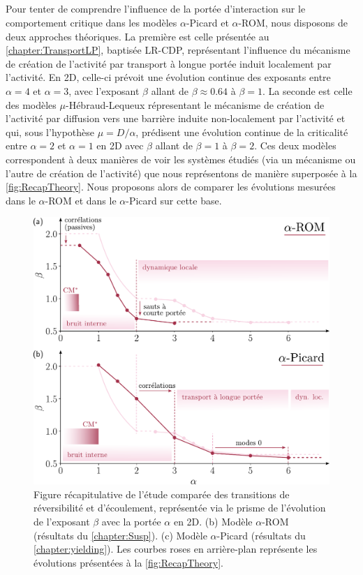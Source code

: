 \subparagraph{}Pour tenter de comprendre l'influence de la portée d'interaction sur le comportement critique dans les modèles $\alpha$-Picard et $\alpha$-ROM, nous disposons de deux approches théoriques. La première est celle présentée au \autoref{chapter:TransportLP}, baptisée LR-CDP, représentant l'influence du mécanisme de création de l'activité par transport à longue portée induit localement par l'activité. En 2D, celle-ci prévoit une évolution continue des exposants entre $\alpha = 4$ et $\alpha = 3$, avec l'exposant $\beta$ allant de $\beta \approx 0.64$ à $\beta = 1$. La seconde est celle des modèles $\mu$-Hébraud-Lequeux répresentant le mécanisme de création de l'activité par diffusion vers une barrière induite non-localement par l'activité et qui, sous l'hypothèse $\mu = D/\alpha$, prédisent une évolution continue de la criticalité entre $\alpha=2$ et $\alpha = 1$ en 2D avec $\beta$ allant de $\beta = 1$ à $\beta = 2$. Ces deux modèles correspondent à deux manières de voir les systèmes étudiés (via un mécanisme ou l'autre de création de l'activité) que nous représentons de manière superposée à la \autoref{fig:RecapTheory}. Nous proposons alors de comparer les évolutions mesurées dans le $\alpha$-ROM et dans le $\alpha$-Picard sur cette base.

\begin{figure}[H]
	\centering
	\includegraphics[width=\textwidth]{Chapitre5/Figures/FigRecap.pdf}
	\caption{Figure récapitulative de l'étude comparée des transitions de réversibilité et d'écoulement, représentée via le prisme de l'évolution de l'exposant $\beta$ avec la portée $\alpha$ en 2D. (b) Modèle $\alpha$-ROM (résultats du \autoref{chapter:Susp}). (c) Modèle $\alpha$-Picard (résultats du \autoref{chapter:yielding}). Les courbes roses en arrière-plan représente les évolutions présentées à la \autoref{fig:RecapTheory}.}
	\label{fig:Recap}
\end{figure}

